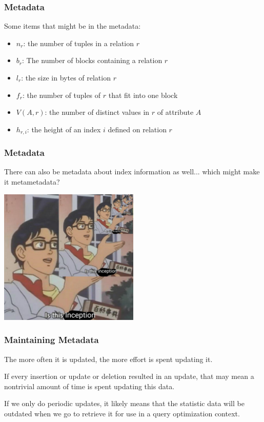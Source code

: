 \begin{frame}
\frametitle{Metadata}

Some items that might be in the metadata:

\begin{itemize}
	\item $n_{r}$: the number of tuples in a relation $r$ 
	\item $b_{r}$: The number of blocks containing a relation $r$ 
	\item $l_{r}$: the size in bytes of relation $r$
	\item $f_{r}$: the number of tuples of $r$ that fit into one block
	\item $V(A, r)$: the number of distinct values in $r$ of attribute $A$
	\item $h_{r, i}$: the height of an index $i$ defined on relation $r$
\end{itemize}

\end{frame}


\begin{frame}
\frametitle{Metadata}

There can also be metadata about index information as well... which might make it metametadata?

\begin{center}
	\includegraphics[width=0.5\textwidth]{images/inception.jpeg}
\end{center}

\end{frame}



\begin{frame}
\frametitle{Maintaining Metadata}

The more often it is updated, the more effort is spent updating it. 

If every insertion or update or deletion resulted in an update, that may mean a nontrivial amount of time is spent updating this data. 

If we only do periodic updates, it likely means that the statistic data will be outdated when we go to retrieve it for use in a query optimization context. 


\end{frame}

